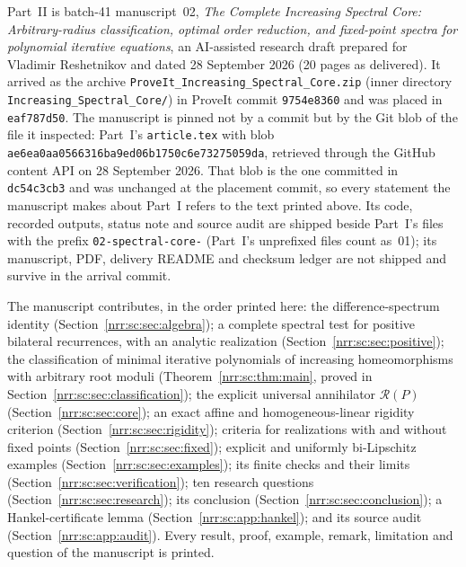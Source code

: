 \documentclass[11pt,letterpaper]{article}
\theoremstyle{definition}
\theoremstyle{remark}
\newcommand{\core}{\mathcal R}
\begin{document}
Part~II is batch-41 manuscript~02, \emph{The Complete Increasing Spectral
Core: Arbitrary-radius classification, optimal order reduction, and
fixed-point spectra for polynomial iterative equations}, an AI-assisted
research draft prepared for Vladimir Reshetnikov and dated 28 September 2026
(20 pages as delivered). It arrived as the archive
\texttt{ProveIt\_Increasing\_Spectral\_Core.zip} (inner directory
\texttt{Increasing\_Spectral\_Core/}) in ProveIt commit \texttt{9754e8360} and
was placed in \texttt{eaf787d50}. The manuscript is pinned not by a commit but
by the Git blob of the file it inspected: Part~I's \texttt{article.tex} with
blob \texttt{ae6ea0aa0566316ba9ed06b1750c6e73275059da}, retrieved through the
GitHub content API on 28 September 2026. That blob is the one committed in
\texttt{dc54c3cb3} and was unchanged at the placement commit, so every
statement the manuscript makes about Part~I refers to the text printed above.
Its code, recorded outputs, status note and source audit are shipped beside
Part~I's files with the prefix \nolinkurl{02-spectral-core-} (Part~I's unprefixed
files count as~01); its manuscript, PDF, delivery README and checksum ledger
are not shipped and survive in the arrival commit.

The manuscript contributes, in the order printed here: the difference-spectrum
identity (Section~\ref{nrr:sc:sec:algebra}); a complete spectral test for
positive bilateral recurrences, with an analytic realization
(Section~\ref{nrr:sc:sec:positive}); the classification of minimal iterative
polynomials of increasing homeomorphisms with arbitrary root moduli
(Theorem~\ref{nrr:sc:thm:main}, proved in
Section~\ref{nrr:sc:sec:classification}); the explicit universal annihilator
$\core(P)$ (Section~\ref{nrr:sc:sec:core}); an exact affine and
homogeneous-linear rigidity criterion (Section~\ref{nrr:sc:sec:rigidity});
criteria for realizations with and without fixed points
(Section~\ref{nrr:sc:sec:fixed}); explicit and uniformly bi-Lipschitz
examples (Section~\ref{nrr:sc:sec:examples}); its finite checks and their
limits (Section~\ref{nrr:sc:sec:verification}); ten research questions
(Section~\ref{nrr:sc:sec:research}); its conclusion
(Section~\ref{nrr:sc:sec:conclusion}); a Hankel-certificate lemma
(Section~\ref{nrr:sc:app:hankel}); and its source audit
(Section~\ref{nrr:sc:app:audit}). Every result, proof, example, remark,
limitation and question of the manuscript is printed.
\end{document}

